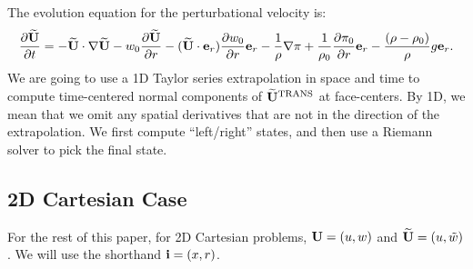 The evolution equation for the perturbational velocity is:
\begin{equation}
\frac{\partial\widetilde{{\bf U}}}{\partial t} = -\widetilde{{\bf U}}\cdot\nabla\widetilde{{\bf U}} - w_0\frac{\partial\widetilde{{\bf U}}}{\partial r} - (\widetilde{{\bf U}}\cdot{\bf e}_r)\frac{\partial w_0}{\partial r}{\bf e}_r - \frac{1}{\rho}\nabla\pi + \frac{1}{\rho_0}\frac{\partial\pi_0}{\partial r}{\bf e}_r - \frac{(\rho-\rho_0)}{\rho}g{\bf e}_r.\label{Perturbational Velocity Equation}
\end{equation}
We are going to use a 1D Taylor series extrapolation in space and time
to compute time-centered normal components of $\widetilde{{\bf U}}^{\rm TRANS}$ at
face-centers.  By 1D, we mean that we omit any spatial derivatives
that are not in the direction of the extrapolation.  We first compute
``left/right'' states, and then use a Riemann solver to pick the final
state.

\subsection{2D Cartesian Case}
For the rest of this paper, for 2D Cartesian problems, ${\bf U} = (u,w)$
and $\widetilde{{\bf U}} = (u,\tilde{w})$.  We will use the shorthand ${\bf i} = (x,r)$.\\

